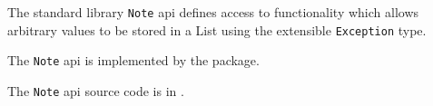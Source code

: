 
The standard library {\tt Note} api defines access to functionality 
which allows arbitrary values to be stored in a List using the 
extensible {\tt Exception} type.

The {\tt Note} api is implemented by the  package.

The {\tt Note} api source code is in .






